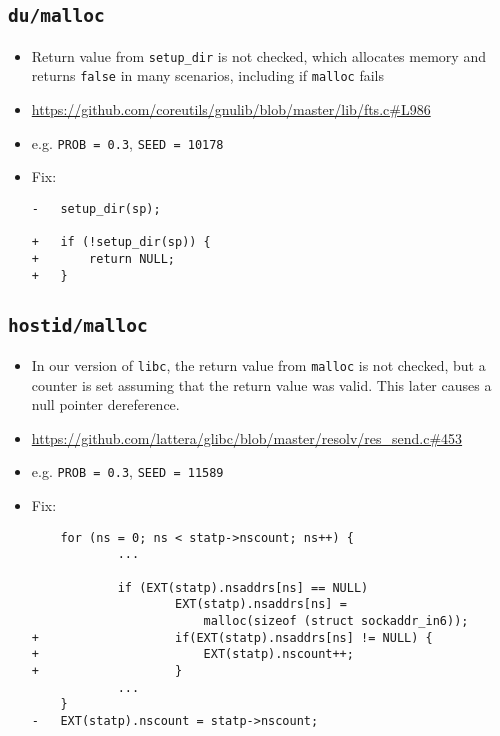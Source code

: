 \subsection{\texttt{du/malloc}}
\begin{itemize}
\item Return value from \texttt{setup\_dir} is not checked, which allocates memory and returns \texttt{false} in many scenarios, including if \texttt{malloc} fails
\item \href{https://github.com/coreutils/gnulib/blob/master/lib/fts.c\#L986}{https://github.com/coreutils/gnulib/blob/master/lib/fts.c\#L986}
\item e.g. \texttt{PROB = 0.3}, \texttt{SEED = 10178}
\item Fix:
\begin{lstlisting}
-	setup_dir(sp);

+	if (!setup_dir(sp)) {
+		return NULL;
+	}
\end{lstlisting}
\end{itemize}

\subsection{\texttt{hostid/malloc}}
\begin{itemize}
\item In our version of \texttt{libc}, the return value from \texttt{malloc} is not checked, but a counter is set assuming that the return value was valid. This later causes a null pointer dereference.
\item \href{https://github.com/lattera/glibc/blob/master/resolv/res\_send.c\#L453}{https://github.com/lattera/glibc/blob/master/resolv/res\_send.c\#453}
\item e.g. \texttt{PROB = 0.3}, \texttt{SEED = 11589}
\item Fix:
\begin{lstlisting}
	for (ns = 0; ns < statp->nscount; ns++) {
			...
			
	        if (EXT(statp).nsaddrs[ns] == NULL)
	                EXT(statp).nsaddrs[ns] =
	                    malloc(sizeof (struct sockaddr_in6));
+	                if(EXT(statp).nsaddrs[ns] != NULL) {
+	                	EXT(statp).nscount++;
+	                }
			...
	}
-	EXT(statp).nscount = statp->nscount;
\end{lstlisting}
\end{itemize}
